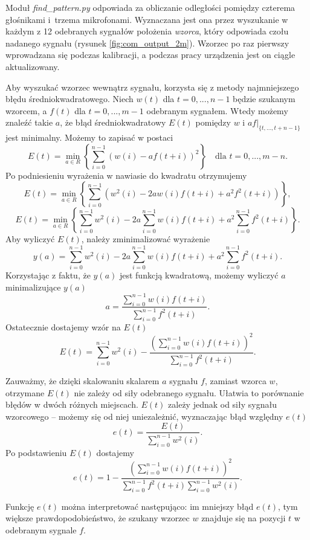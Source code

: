 Moduł \textit{find\_pattern.py} odpowiada za obliczanie odległości pomiędzy czterema głośnikami i~trzema mikrofonami.
Wyznaczana jest ona przez wyszukanie w każdym z 12 odebranych sygnałów  położenia \textit{wzorca}, który 
odpowiada czołu nadanego sygnału (rysunek \ref{fig:com_output_2m}).
Wzorzec po raz pierwszy wprowadzana się podczas kalibracji, a  
podczas pracy urządzenia jest on ciągle aktualizowany.

Aby wyszukać wzorzec wewnątrz sygnału, korzysta się z  metody najmniejszego błędu średniokwadratowego.
Niech $w(t)$  dla $t = 0, ..., n-1$ będzie szukanym wzorcem, a $f(t)$ dla $t = 0, ..., m-1$ odebranym sygnałem.
Wtedy możemy znaleźć takie $a$, że błąd średniokwadratowy $E(t)$ pomiędzy $w$ i $a f |_{\{t, ..., t+n-1\}}$ jest minimalny.
Możemy to zapisać w postaci
\[
  E(t) = \min_{a \in R} \left\{ \sum_{i=0}^{n-1}  \left( w(i) - a f(t+i) \right) ^2 \right\} \quad \text{dla } t = 0, ..., m-n.
\]
Po podniesieniu wyrażenia w nawiasie do kwadratu otrzymujemy
\[
  E(t) = \min_{a \in R} \left\{ \sum_{i=0}^{n-1}  \left( w^2(i) -2a w(i) f(t+i) + a^2 f^2(t+i) \right) \right\},
\]
\[
  E(t) = \min_{a \in R} \left\{ \sum_{i=0}^{n-1}  w^2(i) -2a \sum_{i=0}^{n-1}  w(i) f(t+i) + a^2 \sum_{i=0}^{n-1} f^2(t+i) \right\}.
\]
Aby wyliczyć $E(t)$, należy zminimalizować wyrażenie
\[
  y(a) = \sum_{i=0}^{n-1}  w^2(i) -2a \sum_{i=0}^{n-1}  w(i) f(t+i) + a^2 \sum_{i=0}^{n-1} f^2(t+i).
\]
Korzystając z faktu, że $y(a)$ jest funkcją kwadratową, możemy wyliczyć $a$ minimalizujące $y(a)$
\[
  a = \frac{ \sum\limits_{i=0}^{n-1}  w(i) f(t+i) }{ \sum\limits_{i=0}^{n-1} f^2(t+i) }.
\]
Ostatecznie dostajemy wzór na $E(t)$
\[
  E(t) = \sum_{i=0}^{n-1}  w^2(i)  - \frac {\left(\sum\limits_{i=0}^{n-1}  w(i) f(t+i) \right)^2 } { \sum\limits_{i=0}^{n-1} f^2(t+i)}.
\]

Zauważmy, że dzięki skalowaniu skalarem $a$  sygnału $f$, zamiast wzorca $w$,
otrzymane $E(t)$ nie zależy od siły odebranego sygnału. Ułatwia to porównanie błędów w dwóch różnych miejscach.
$E(t)$ zależy jednak od siły sygnału wzorcowego -- możemy się od niej uniezależnić, wyznaczając
błąd względny $e(t)$
\[
  e(t) = \frac{E(t)}{\sum\limits_{i=0}^{n-1}  w^2(i)}.
\]
Po podstawieniu $E(t)$ dostajemy
\[
  e(t) = 1 - \frac {\left(\sum\limits_{i=0}^{n-1}  w(i) f(t+i) \right)^2 } { \sum\limits_{i=0}^{n-1} f^2(t+i) \sum\limits_{i=0}^{n-1}  w^2(i)}.
\]
 
 Funkcję $e(t)$  można interpretować następująco:
 im mniejszy błąd $e(t)$, tym większe prawdopodobieństwo, że szukany wzorzec $w$ znajduje się na pozycji $t$ w 
 odebranym sygnale $f$. 

